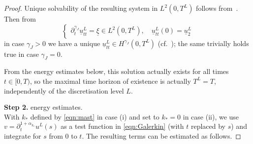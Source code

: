 \begin{proof}
\begin{comment}
{_0I_t}^1 \underline{u}_{tt}^L + \underline{u}_1^L &\mbox{ if }\gamma_J=0
\end{cases}
\\
\partial_t^{\alpha_k}\underline{u}^L(t)  
&={_0I_t}^{1-\alpha_k}\underline{u}_t^L(t) \\
&={_0I_t}^{2+\gamma_J-\alpha_k} \underline{\xi}^L (t) 
+ \frac{t^{2-\alpha_k}\underline{u}_2^L}{\Gamma(3-\alpha_k)}
+ \frac{t^{1-\alpha_k}\underline{u}_1^L}{\Gamma(2-\alpha_k)}\,,
\end{aligned}
\]
where the term containing $\underline{u}_2^L$ can be skipped in case $\gamma_J=0$.
This results in the following Volterra integral equation for $\xi$
\[
\begin{aligned}
\underline{\xi}^L(t) + (M_{a,J}^L)^{-1}\Bigl\{
\sum_{j=0}^J M_{a,n}^L {_0I_t}^{\gamma_J-\gamma_j} \underline{\xi}^L(t) 
+ \sum_{k=0}^K K_{b,k}^L {_0I_t}^{2+\gamma_J-\alpha_k} \underline{\xi}^L(t)\Bigr\}
= \underline{\tilde{r}}^L(t)\,,\\ 
\quad t\in(0,T),
\end{aligned}
\]
where $\underline{\tilde{r}}^L(t)=(M_{a,J}^L)^{-1}\left\{ \underline{r}^L(t)
- \sum_{k=0}^K K_{b,k}^L \left(\frac{t^{2-\alpha_k}\underline{u}_2^L}{\Gamma(3-\alpha_k)}
+ \frac{t^{1-\alpha_k}\underline{u}_1^L}{\Gamma(2-\alpha_k)}
\right)\right\}$,
and again the terms containing $\underline{u}_2^L$ can be skipped in case $\gamma_J=0$.
\end{comment}
Unique solvability of the resulting system in $L^2(0,T^L)$ follows from~\cite[Theorem 4.2, p. 241 in \S 9]{GLS90}. Then from	
\[ \left \{
	\begin{aligned}
	\partial_t^{\gamma_J}\underline{u}_{tt}^L =\underline{\xi} \in L^2(0,T^L), \quad
	\underline{u}^L_{tt}(0)=\underline{u}_{2}^L
	\end{aligned} \right.
	\]
in case $\gamma_J>0$ we have a unique $\underline{u}_{tt}^L \in H^{\gamma_J}(0,T^L)$ (cf.~\cite[\S 3.3]{KubicaRyszewskaYamamoto:2020}); the same trivially holds true in case $\gamma_J=0$. 

From the energy estimates below, this solution actually exists for all times $t\in[0,T)$, so the maximal time horizon of existence is actually $T^L=T$, independently of the discretisation level $L$.

\noindent
{\bf Step 2.} energy estimates.\\
With $k_*$ defined by \eqref{eqn:mast} in case (i) and set to $k_*=0$ in case (ii), we use $v=\partial_t^{1+\alpha_{k_*}}u^L(s)$ as a test function in \eqref{eqn:Galerkin} (with $t$ replaced by $s$) and integrate for $s$ from $0$ to $t$. 
The resulting terms can be estimated as follows.


\end{proof}
